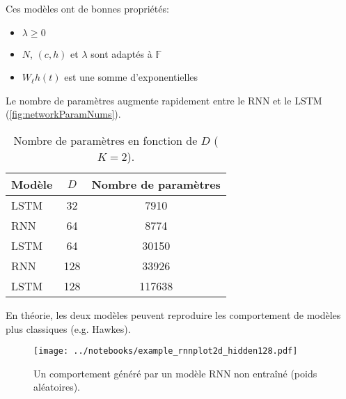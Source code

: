 \documentclass[../main.tex]{subfiles}
\begin{document}
\begin{frame}
Ces modèles ont de bonnes propriétés:
\begin{itemize}
	\item[\textbullet] $\lambda \geq 0$
	\item[\textbullet] $N$, $(c,h)$ et $\lambda$ sont adaptés à $\mathds{F}$
	\item[\textbullet] $W_\ell h(t)$ est une somme d'exponentielles
\end{itemize}


\end{frame}

\begin{frame}
Le nombre de paramètres augmente rapidement entre le RNN et le LSTM (\autoref{fig:networkParamNums}).

\begin{table}
\begin{tabular}{l|cc}\toprule
	Modèle & $D$ & Nombre de paramètres \\ \midrule
	LSTM & 32 & 7910 \\
	RNN & 64 & 8774 \\
	LSTM & 64 & 30150 \\
	RNN & 128 & 33926 \\
	LSTM & 128 & 117638 \\ \bottomrule
\end{tabular}\caption{Nombre de paramètres en fonction de $D$ ($K=2$).}\label{fig:networkParamNums}
\end{table}

\end{frame}

\begin{frame}
En théorie, les deux modèles peuvent reproduire les comportement de modèles plus classiques (e.g. Hawkes).

\begin{figure}
\texttt{[image: ../notebooks/example\_rnnplot2d\_hidden128.pdf]}
\caption{Un comportement généré par un modèle RNN non entraîné (poids aléatoires).}\label{fig:untrained1DRNNIntensity}
\end{figure}

\end{frame}
\end{document}
